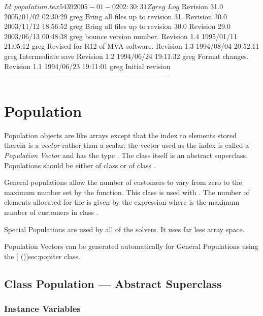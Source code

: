 \C 
\C $Id: population.tex 5439 2005-01-02 02:30:31Z greg $
\C 
\C $Log$
\C Revision 31.0  2005/01/02 02:30:29  greg
\C Bring all files up to revision 31.
\C
\C Revision 30.0  2003/11/12 18:56:52  greg
\C Bring all files up to revision 30.0
\C
\C Revision 29.0  2003/06/13 00:48:38  greg
\C bounce version number.
\C
\C Revision 1.4  1995/01/11 21:05:12  greg
\C Revised for R12 of MVA software.
\C
\C Revision 1.3  1994/08/04  20:52:11  greg
\C Intermediate save
\C
\C Revision 1.2  1994/06/24  19:11:32  greg
\C Format changes.
\C
\C Revision 1.1  1994/06/23  19:11:01  greg
\C Initial revision
\C
\C ----------------------------------------------------------------------
\section{Population}
\label{sec:population}

Population objects are like arrays except that the index to elements
stored therein is a \emph{vector} rather than a scalar; the vector
used as the index is called a \emph{Population Vector} and has the
type .  The class  itself is an
abstract superclass.  Populations should be either of class
 or of class
.

General populations allow the number of customers to vary from zero to
the maximum number set by the
 function.  This
class is used with .  The number of
elements allocated for the  is
given by the expression  where  is the maximum number of customers
in class .

Special Populations are used by all of the  solvers.  It uses far less array space.

Population Vectors can be generated automatically for General
Populations using the [
(\Sec\Ref)]{sec:popiter} class.

\subsection{Class Population --- Abstract Superclass}
\subsubsection{Instance Variables}
\label{sec:population-ivars}


